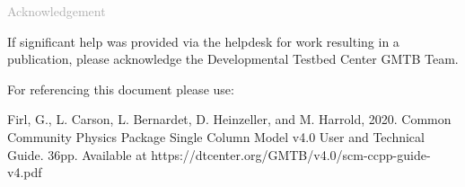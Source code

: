 \begin{titlepage}
\vspace*{0.5cm}
\noindent

\begin{flushleft}
\textcolor{darkgray}{\LARGE Acknowledgement}
\vspace*{1cm}\par

If significant help was provided via the helpdesk for work resulting in a publication, please acknowledge the Developmental Testbed Center GMTB Team.\\
\vspace*{1cm}\par
For referencing this document please use:\\
\vspace*{1cm}\par
Firl, G., L. Carson, L. Bernardet, D. Heinzeller, and M. Harrold, 2020. Common Community Physics Package Single Column Model v4.0 User and Technical Guide. 36pp. Available at https://dtcenter.org/GMTB/v4.0/scm-ccpp-guide-v4.pdf

\end{flushleft}
\end{titlepage}
\pagebreak{}
